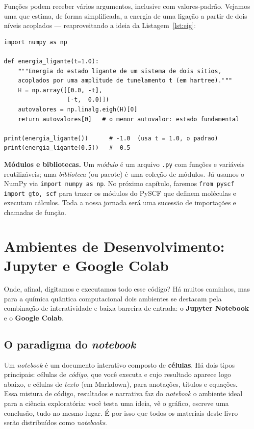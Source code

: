 \documentclass[11pt,a4paper,openany]{book}
\newcommand{\code}[1]{\texttt{#1}}
\newcommand{\pyscf}{\textsf{PySCF}}
\newcommand{\numpy}{\textsf{NumPy}}
\begin{document}
Funções podem receber vários argumentos, inclusive com valores-padrão. Vejamos
uma que estima, de forma simplificada, a energia de uma ligação a partir de dois
níveis acoplados --- reaproveitando a ideia da Listagem~\ref{lst:eig}:

\begin{lstlisting}[style=python,caption={Função com valor-padrão e uso de \numpy{}.}]
import numpy as np

def energia_ligante(t=1.0):
    """Energia do estado ligante de um sistema de dois sitios,
    acoplados por uma amplitude de tunelamento t (em hartree)."""
    H = np.array([[0.0, -t],
                  [-t,  0.0]])
    autovalores = np.linalg.eigh(H)[0]
    return autovalores[0]   # o menor autovalor: estado fundamental

print(energia_ligante())      # -1.0  (usa t = 1.0, o padrao)
print(energia_ligante(0.5))   # -0.5
\end{lstlisting}

\begin{caixanota}
\textbf{Módulos e bibliotecas.} Um \emph{módulo} é um arquivo \code{.py} com funções
e variáveis reutilizáveis; uma \emph{biblioteca} (ou pacote) é uma coleção de
módulos. Já usamos o \numpy{} via \code{import numpy as np}. No próximo capítulo,
faremos \code{from pyscf import gto, scf} para trazer os módulos do \pyscf{} que
definem moléculas e executam cálculos. Toda a nossa jornada será uma sucessão de
importações e chamadas de função.
\end{caixanota}

\section{Ambientes de Desenvolvimento: Jupyter e Google Colab}
\label{sec:ambientes}

Onde, afinal, digitamos e executamos todo esse código? Há muitos caminhos, mas
para a química quântica computacional dois ambientes se destacam pela combinação
de interatividade e baixa barreira de entrada: o \textbf{Jupyter Notebook} e o
\textbf{Google Colab}.

\subsection{O paradigma do \emph{notebook}}

Um \emph{notebook} é um documento interativo composto de \textbf{células}. Há dois
tipos principais: células de \emph{código}, que você executa e cujo resultado
aparece logo abaixo, e células de \emph{texto} (em Markdown), para anotações,
títulos e equações. Essa mistura de código, resultados e narrativa faz do
\emph{notebook} o ambiente ideal para a ciência exploratória: você testa uma
ideia, vê o gráfico, escreve uma conclusão, tudo no mesmo lugar. É por isso que
todos os materiais deste livro serão distribuídos como \emph{notebooks}.
\end{document}
